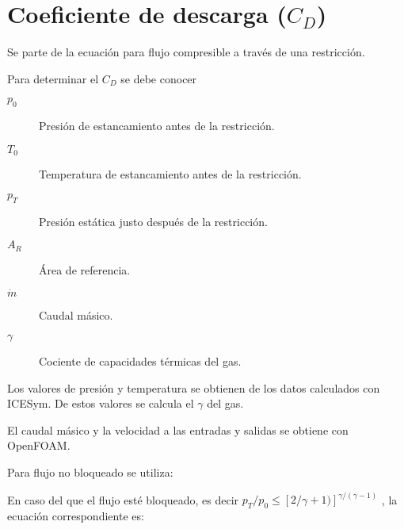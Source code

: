 

\section{Coeficiente de descarga ($C_D$)}

Se parte de la ecuación para flujo compresible a través de una restricción.

Para determinar el $C_D$ se debe conocer

\begin{description}
    \item[$p_0$] Presión de estancamiento antes de la restricción.
    \item[$T_0$] Temperatura de estancamiento antes de la restricción.
    \item[$p_T$] Presión estática justo después de la restricción.
    \item[$A_R$] Área de referencia.
    \item[$\dot{m}$] Caudal másico.
    \item[$\gamma$] Cociente de capacidades térmicas del gas.
\end{description}

Los valores de presión y temperatura se obtienen de los datos calculados con
ICESym. De estos valores se calcula el $\gamma$ del gas.

El caudal másico y la velocidad a las entradas y salidas se obtiene con
OpenFOAM.

Para flujo no bloqueado se utiliza:

En caso del que el flujo esté bloqueado, es decir
$p_T/p_0 \le [2/\gamma+1)]^{\gamma/(\gamma - 1)}$
, la ecuación correspondiente es:


